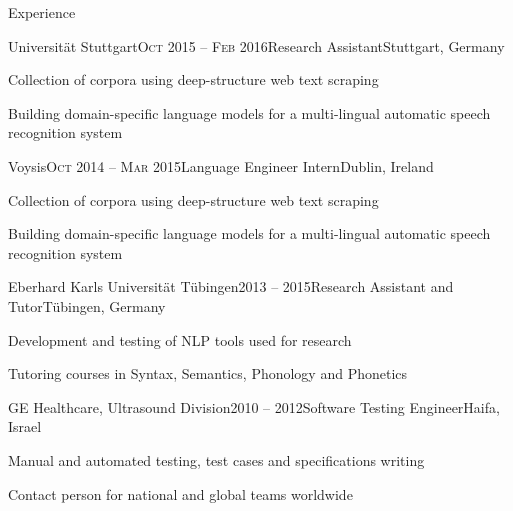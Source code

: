 \documentclass{resume} %
\begin{document}
\begin{rSection}{Experience}

\begin{rSubsection}{Universität Stuttgart}{\textsc{Oct} 2015 -- \textsc{Feb} 2016}{Research Assistant}{Stuttgart, Germany}
	\setlength{\itemindent}{.7cm}
	
	\item Collection of corpora using deep-structure web text scraping
	
	\item Building domain-specific language models for a multi-lingual automatic speech recognition system 
\end{rSubsection}

\begin{rSubsection}{Voysis}{\textsc{Oct} 2014 -- \textsc{Mar} 2015}{Language Engineer Intern}{Dublin, Ireland}
	\setlength{\itemindent}{.7cm}
	
	\item Collection of corpora using deep-structure web text scraping
	
	\item Building domain-specific language models for a multi-lingual automatic speech recognition system 
\end{rSubsection}

\begin{rSubsection}{Eberhard Karls Universität Tübingen}{2013 -- 2015}{Research Assistant and Tutor}{Tübingen, Germany}
	\setlength{\itemindent}{.7cm}
	
	\item Development and testing of NLP tools used for research %
	
	\item Tutoring courses in Syntax, Semantics, Phonology and Phonetics %
\end{rSubsection}

\begin{rSubsection}{GE Healthcare, Ultrasound Division}{2010 -- 2012}{Software Testing Engineer}{Haifa, Israel}
	\setlength{\itemindent}{.7cm}
	
	\item Manual and automated testing, test cases and specifications writing
	
	\item Contact person for national and global teams worldwide 
\end{rSubsection}


\end{rSection}
\end{document}
